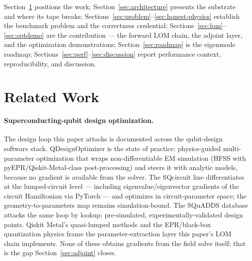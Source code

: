 \documentclass{anvil-paper}
\begin{document}
Section~\ref{sec:related} positions the work; Section~\ref{sec:architecture}
presents the substrate and where its tape breaks;
Sections~\ref{sec:problem}--\ref{sec:honest-physics} establish the
benchmark problem and the correctness credential;
Sections~\ref{sec:lom}--\ref{sec:optdemo} are the contribution ---
the forward LOM chain, the adjoint layer, and the optimization
demonstrations; Section~\ref{sec:roadmap} is the eigenmode roadmap;
Sections~\ref{sec:perf}--\ref{sec:discussion} report performance context,
reproducibility, and discussion.

\section{Related Work}
\label{sec:related}

\paragraph{Superconducting-qubit design optimization.}
The design loop this paper attacks is documented across the qubit-design
software stack. QDesignOptimizer \citep{eriksson2025automated} is the
state of practice: physics-guided multi-parameter optimization that
wraps non-differentiable EM simulation (HFSS with pyEPR/Qiskit-Metal-class
post-processing) and steers it with analytic models, because no gradient
is available from the solver. The SQcircuit line
\citep{rajabzadeh2023analysis,rajabzadeh2024general} differentiates at
the lumped-circuit level --- including eigenvalue/eigenvector gradients
of the circuit Hamiltonian via PyTorch --- and optimizes in circuit-parameter
space; the geometry-to-parameters map remains simulation-bound. The
SQuADDS database \citep{shanto2024squadds} attacks the same loop by
lookup: pre-simulated, experimentally-validated design points. Qiskit
Metal's quasi-lumped methods \citep{minev2021circuit} and the
EPR/black-box quantization physics
\citep{koch2007,nigg2012,minev2021} frame the parameter-extraction layer
this paper's LOM chain implements. None of these obtains gradients from
the field solve itself; that is the gap Section~\ref{sec:adjoint} closes.
\end{document}
